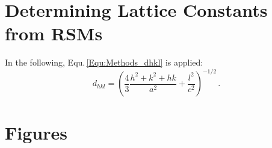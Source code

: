 \begin{appendices}
\chapter{Determining Lattice Constants from RSMs}
In the following, Equ.\,\ref{Equ:Methods_dhkl} is applied:
\begin{equation*}
    d_{hkl}=\left(
        \frac{4}{3}\frac{h^2+k^2+hk}{a^2}
        +\frac{l^2}{c^2}
    \right)^{-1/2}\,.
\end{equation*}




\chapter{Figures}


\end{appendices}